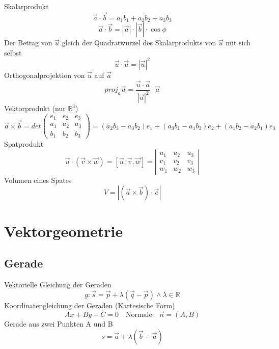 \documentclass{report}
\begin{document}
Skalarprodukt
\begin{equation}\vec{a} \cdot \vec{b} = a_1b_1 + a_2b_2 + a_3b_3\end{equation}
\begin{equation}\vec{a} \cdot \vec{b} = |\vec{a}| \cdot |\vec{b}| \cdot \cos{\phi}\end{equation}
Der Betrag von $\vec{u}$ gleich der Quadratwurzel des Skalarprodukts von $\vec{u}$ mit sich selbst
\begin{equation}\vec{u} \cdot \vec{u} = {|\vec{u}|}^2\end{equation}
Orthogonalprojektion von $\vec{u}$ auf $\vec{a}$
\begin{equation}proj_a\vec{u} = \frac{\vec{u} \cdot \vec{a}}{{|\vec{a}|}^2} \cdot \vec{a}\end{equation}
Vektorprodukt (nur $\mathbb{R}^3$)
\begin{equation}\vec{a} \times \vec{b} = det\left(\begin{matrix}e_1 & e_2 & e_3 \\ a_1 & a_2 & a_3 \\ b_1 & b_2 & b_3\end{matrix}\right) = (a_2b_3-a_3b_2)e_1 + (a_3b_1-a_1b_3)e_2 + (a_1b_2-a_2b_1)e_3\end{equation}
Spatprodukt
\begin{equation}\vec{u} \cdot (\vec{v} \times \vec{w}) = [\vec{u}, \vec{v}, \vec{w}] = \left|\begin{matrix}u_1 & u_2 & u_3 \\ v_1 & v_2 & v_3 \\ w_1 & w_2 & w_3\end{matrix}\right|\end{equation}
Volumen eines Spates
\begin{equation}V = |(\vec{a} \times \vec{b}) \cdot \vec{c}|\end{equation}
\section{Vektorgeometrie}
\subsection{Gerade}
Vektorielle Gleichung der Geraden
\begin{equation}g: \vec{s} = \vec{p} + \lambda(\vec{q} - \vec{p}) \land \lambda \in \mathbb{R}\end{equation}
Koordinatengleichung der Geraden (Kartesische Form)
\begin{equation}Ax + By + C = 0 \quad \mbox{Normale} \quad \vec{n} = (A, B)\end{equation}
Gerade aus zwei Punkten A und B
\begin{equation}s = \vec{a} + \lambda (\vec{b} - \vec{a})\end{equation}
\end{document}
